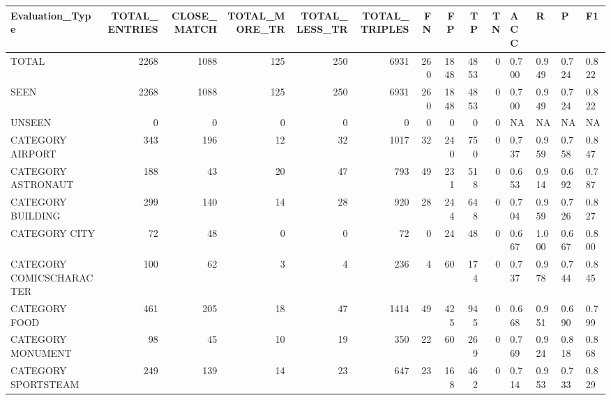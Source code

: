 \begin{tabular}{lrrrrrrrrrllll}
\hline
 Evaluation\_Type          &   TOTAL\_ENTRIES &   CLOSE\_MATCH &   TOTAL\_MORE\_TR &   TOTAL\_LESS\_TR &   TOTAL\_TRIPLES &   FN &   FP &   TP &   TN & ACC   & R     & P     & F1    \\
\hline
 TOTAL                    &            2268 &          1088 &             125 &             250 &            6931 &  260 & 1848 & 4853 &    0 & 0.700 & 0.949 & 0.724 & 0.822 \\
 SEEN                     &            2268 &          1088 &             125 &             250 &            6931 &  260 & 1848 & 4853 &    0 & 0.700 & 0.949 & 0.724 & 0.822 \\
 UNSEEN                   &               0 &             0 &               0 &               0 &               0 &    0 &    0 &    0 &    0 & NA    & NA    & NA    & NA    \\
 CATEGORY AIRPORT         &             343 &           196 &              12 &              32 &            1017 &   32 &  240 &  750 &    0 & 0.737 & 0.959 & 0.758 & 0.847 \\
 CATEGORY ASTRONAUT       &             188 &            43 &              20 &              47 &             793 &   49 &  231 &  518 &    0 & 0.653 & 0.914 & 0.692 & 0.787 \\
 CATEGORY BUILDING        &             299 &           140 &              14 &              28 &             920 &   28 &  244 &  648 &    0 & 0.704 & 0.959 & 0.726 & 0.827 \\
 CATEGORY CITY            &              72 &            48 &               0 &               0 &              72 &    0 &   24 &   48 &    0 & 0.667 & 1.000 & 0.667 & 0.800 \\
 CATEGORY COMICSCHARACTER &             100 &            62 &               3 &               4 &             236 &    4 &   60 &  174 &    0 & 0.737 & 0.978 & 0.744 & 0.845 \\
 CATEGORY FOOD            &             461 &           205 &              18 &              47 &            1414 &   49 &  425 &  945 &    0 & 0.668 & 0.951 & 0.690 & 0.799 \\
 CATEGORY MONUMENT        &              98 &            45 &              10 &              19 &             350 &   22 &   60 &  269 &    0 & 0.769 & 0.924 & 0.818 & 0.868 \\
 CATEGORY SPORTSTEAM      &             249 &           139 &              14 &              23 &             647 &   23 &  168 &  462 &    0 & 0.714 & 0.953 & 0.733 & 0.829 \\

\end{tabular}
